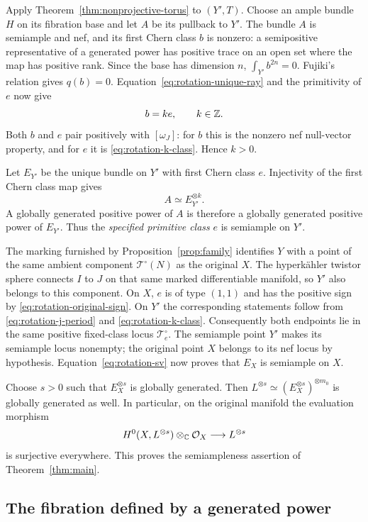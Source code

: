 Apply Theorem~\ref{thm:nonprojective-torus} to $(Y',T)$.  Choose an ample bundle $H$
on its fibration base and let $A$ be its pullback to $Y'$.
The bundle $A$ is semiample and nef, and its first Chern class
$b$ is nonzero: a semipositive representative of a generated
power has positive trace on an open set where the map has
positive rank.  Since the base has dimension $n$,
$\int_{Y'}b^{2n}=0$.  Fujiki's relation \cite{Fujiki} gives
$q(b)=0$.  Equation~\eqref{eq:rotation-unique-ray} and the
primitivity of $e$ now give
\[
                             b=k e,\qquad k\in\mathbb Z.
\]
Both $b$ and $e$ pair positively with $[\omega_J]$: for $b$ this
is the nonzero nef null-vector property, and for $e$ it is
\eqref{eq:rotation-k-class}.  Hence $k>0$.

Let $E_{Y'}$ be the unique bundle on $Y'$ with first Chern class
$e$.  Injectivity of the first Chern class map gives
\[
                          A\simeq E_{Y'}^{\otimes k}.
\]
A globally generated positive power of $A$ is therefore a
globally generated positive power of $E_{Y'}$.  Thus the
\emph{specified primitive class} $e$ is semiample on $Y'$.

The marking furnished by Proposition~\ref{prop:family} identifies
$Y$ with a point of the same ambient component
$\mathcal T^\circ(N)$ as the original $X$.  The hyperk\"ahler
twistor sphere connects $I$ to $J$ on that same marked
differentiable manifold, so $Y'$ also belongs to this component.
On $X$, $e$ is of type $(1,1)$ and has the positive sign by
\eqref{eq:rotation-original-sign}.  On $Y'$ the corresponding
statements follow from \eqref{eq:rotation-j-period} and
\eqref{eq:rotation-k-class}.  Consequently both endpoints lie
in the same positive fixed-class locus $\mathcal T^\circ_e$.
The semiample point $Y'$ makes its semiample locus nonempty;
the original point $X$ belongs to its nef locus by hypothesis.
Equation~\eqref{eq:rotation-sv} now proves that $E_X$ is
semiample on $X$.

Choose $s>0$ such that $E_X^{\otimes s}$ is globally generated.
Then $L^{\otimes s}\simeq(E_X^{\otimes s})^{\otimes m_0}$ is
globally generated as well.  In particular, on the original
manifold the evaluation morphism
\[
 H^0(X,L^{\otimes s})\otimes_{\mathbb C}\mathcal O_X
                    \longrightarrow L^{\otimes s}
\]
is surjective everywhere.  This proves the semiampleness assertion
of Theorem~\ref{thm:main}.

\subsection{The fibration defined by a generated power}

